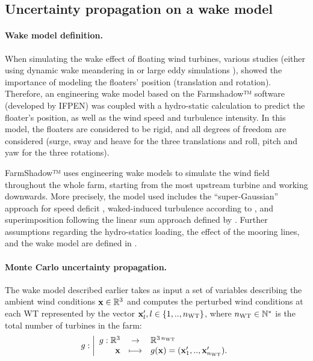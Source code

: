 \subsection{Uncertainty propagation on a wake model}\label{sec:UQ-wake}

\paragraph{Wake model definition.}
When simulating the wake effect of floating wind turbines, various studies (either using dynamic wake meandering in \citealp{wise_2020} or large eddy simulations \citealp{johlas_2020_wake_LES}), showed the importance of modeling the floaters' position (translation and rotation). 
Therefore, an engineering wake model based on the Farmshadow™ software (developed by IFPEN) was coupled with a hydro-static calculation to predict the floater's position, as well as the wind speed and turbulence intensity. 
In this model, the floaters are considered to be rigid, and all degrees of freedom are considered (surge, sway and heave for the three translations and roll, pitch and yaw for the three rotations). 

FarmShadow™ uses engineering wake models to simulate the wind field throughout the whole farm, starting from the most upstream turbine and working downwards. 
More precisely, the model used includes the ``super-Gaussian'' approach for speed deficit \citep{blondel_2020}, waked-induced turbulence according to \citet{quian_2018}, and superimposition following the linear sum approach defined by \citet{zong_2020}.    
Further assumptions regarding the hydro-statics loading, the effect of the mooring lines, and the wake model are defined in \citet{lovera_fekhari_2023}.


\paragraph{Monte Carlo uncertainty propagation.}

The wake model described earlier takes as input a set of variables describing the ambient wind conditions ${\bf x} \in \mathbb{R}^3$ and computes the perturbed wind conditions at each WT represented by the vector ${\bf x} _l', l \in \left\{1,..,n_{\mathrm{WT}}\right\}$, where $n_{\mathrm{WT}} \in \mathbb{N}^*$ is the total number of turbines in the farm:
\begin{equation}
    g : \bigg|
        \begin{array}{rcl}
            g:\mathbb{R}^3 & \rightarrow & \mathbb{R}^{3 \, n_{\mathrm{WT}}} \\
            {\bf x} &\longmapsto & g({\bf x}) = ({\bf x}_1',..,{\bf x}_{n_{\mathrm{WT}}}').
        \end{array}
    \end{equation}

